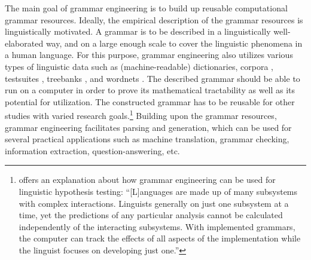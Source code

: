 The main goal of grammar engineering is to build up reusable
computational grammar resources. Ideally, the
empirical description of the grammar resources is linguistically
motivated. A grammar is to be described in a linguistically
well-elaborated way, and on a large enough scale to cover the
linguistic phenomena in a human language.  For this purpose, grammar
engineering also utilizes various types of linguistic data such as
(machine-readable) dictionaries, corpora
\citep{nichols:etal:10,song:etal:10}, testsuites \citep{oepen:01},
treebanks \citep{oepen:etal:04,bond:etal:06}, and wordnets
\citep{bond:etal:09,pozen:13}.  The described grammar should be able
to run on a computer in order to prove its mathematical tractability
as well as its potential for utilization. The constructed grammar has
to be reusable for other studies with varied research
goals.\footnote{\citet[16]{bender:08} offers an explanation about how
  grammar engineering can be used for linguistic hypothesis testing:
  ``[L]anguages are made up of many subsystems with complex
  interactions. Linguists generally  on just one subsystem
  at a time, yet the predictions of any particular analysis cannot be
  calculated independently of the interacting subsystems. With
  implemented grammars, the computer can track the effects of all
  aspects of the implementation while the linguist focuses on
  developing just one.''} Building upon the grammar resources, grammar
engineering facilitates parsing and generation, which can be used for
several practical applications such as machine translation, grammar
checking, information extraction, question-answering, etc.




